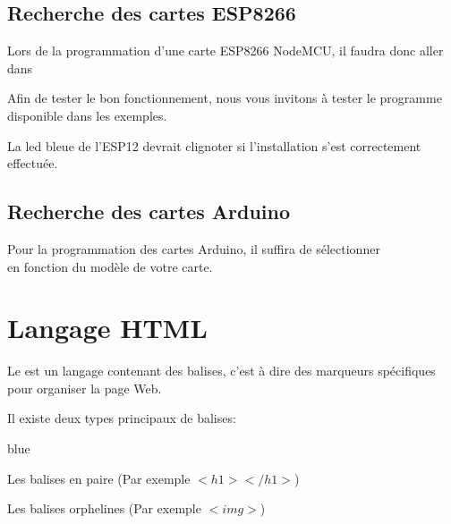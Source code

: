 {\section{Recherche des cartes ESP8266}


Lors de la programmation d'une carte ESP8266 NodeMCU, il faudra donc aller dans \\



Afin de tester le bon fonctionnement, nous vous invitons à tester le programme  disponible dans les exemples.


La led bleue de l'ESP12 devrait clignoter si l'installation s'est correctement effectuée.

\section{Recherche des cartes Arduino}

Pour la programmation des cartes Arduino, il suffira de sélectionner \\
 en fonction du modèle de votre carte.\chapter{Langage HTML}

Le  est un langage contenant des balises, c'est à dire des 
marqueurs spécifiques pour organiser la page Web.

Il existe deux types principaux de balises: 

\begin{items}{blue}{\Triangle}
\item Les balises en paire (Par exemple $<h1></h1>$)
\item Les balises orphelines (Par exemple $<img>$)
\end{items}

}
